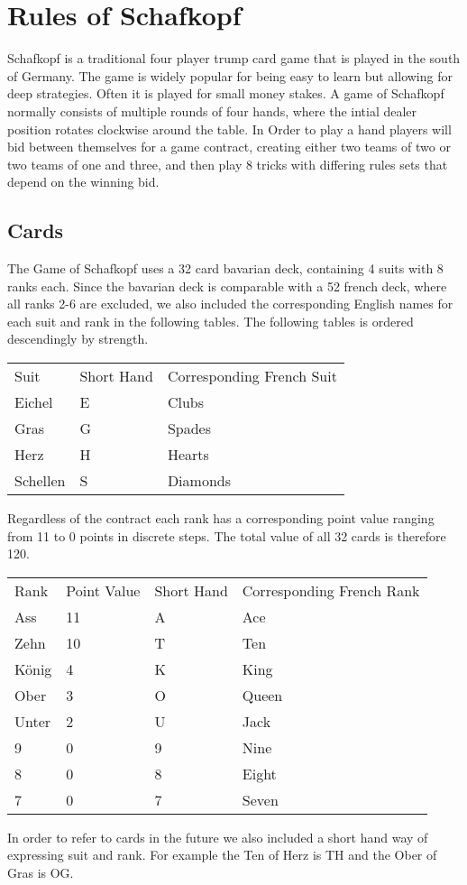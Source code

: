 \chapter{Rules of Schafkopf}
Schafkopf is a traditional four player trump card game that is played in the south of Germany.
The game is widely popular for being easy to learn but allowing for deep strategies.
Often it is played for small money stakes.
A game of Schafkopf normally consists of multiple rounds of four hands, where the intial dealer position rotates clockwise around the table.
In Order to play a hand players will bid between themselves for a game contract, creating either two teams of two or
two teams of one and three, and then play 8 tricks with differing rules sets that depend on the winning bid.
\section{Cards}
The Game of Schafkopf uses a 32 card bavarian deck, containing 4 suits with 8 ranks each.
Since the bavarian deck is comparable with a 52 french deck, where all ranks 2-6 are excluded, we also included the corresponding English names for each suit and rank in the following tables.
The  following tables is ordered descendingly by strength.
\begin{table}[]
\begin{tabular}{lll}
Suit     & Short Hand & Corresponding French Suit \\
Eichel   & E          & Clubs                     \\
Gras     & G          & Spades                    \\
Herz     & H          & Hearts                    \\
Schellen & S          & Diamonds
\end{tabular}\label{tab:table}
\end{table}
Regardless of the contract each rank has a corresponding point value ranging from 11 to 0 points in discrete steps.
The total value of all 32 cards is therefore 120.
\begin{table}[]
\begin{tabular}{llll}
Rank  & Point Value & Short Hand & Corresponding French Rank \\
Ass   & 11          & A          & Ace                       \\
Zehn  & 10          & T          & Ten                       \\
König & 4           & K          & King                      \\
Ober  & 3           & O          & Queen                     \\
Unter & 2           & U          & Jack                      \\
9     & 0           & 9          & Nine                      \\
8     & 0           & 8          & Eight                     \\
7     & 0           & 7          & Seven
\end{tabular}\label{tab:table2}
\end{table}
In order to refer to cards in the future we also included a short hand way of expressing suit and rank. For example
the Ten of Herz is TH and the Ober of Gras is OG.
